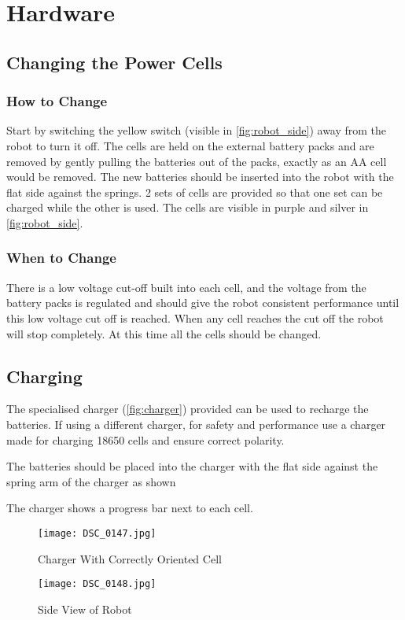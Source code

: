
\section{Hardware}

\subsection{Changing the Power Cells}
\subsubsection{How to Change}
Start by switching the yellow switch (visible in \autoref{fig:robot_side}) away from the robot to turn it off. The cells are held on the external battery packs and are removed by gently pulling the batteries out of the packs, exactly as an AA cell would be removed.  The new batteries should be inserted into the robot with the flat side against the springs. 2 sets of cells are provided so that one set can be charged while the other is used. The cells are visible in purple and silver in \autoref{fig:robot_side}.

\subsubsection{When to Change}
There is a low voltage cut-off built into each cell, and the voltage from the battery packs is regulated and should give the robot consistent performance until this low voltage cut off is reached. When any cell reaches the cut off the robot will stop completely. At this time all the cells should be changed. 


\subsection{Charging}
The specialised charger (\autoref{fig:charger}) provided can be used to recharge the batteries. If using a different charger, for safety and performance use a charger made for charging 18650 cells and ensure correct polarity.

The batteries should be placed into the charger with the flat side against the spring arm of the charger as shown

The charger shows a progress bar next to each cell. 


\begin{figure}[hp]
\centering
\texttt{[image: DSC\_0147.jpg]}
\caption{Charger With Correctly Oriented Cell}
\label{fig:charger}
\end{figure}
\begin{figure}[hp]
\centering
\texttt{[image: DSC\_0148.jpg]}
\caption{Side View of Robot}
\label{fig:robot_side}
\end{figure}



